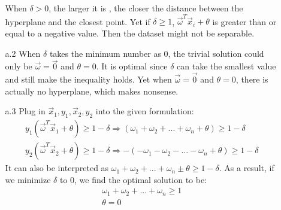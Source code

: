\begin{enumerate}
\begin{enumerate}
	\medskip
	When $\delta > 0 $, the larger it is , the closer the distance between the hyperplane and the closest point. Yet if $\delta \geq 1$, $\vec{\omega}^T\vec{x}_i + \theta$ is greater than or equal to a negative value. Then the dataset might not be separable. 
	
	\item[a.2]
	When $\delta$ takes the minimum number as 0, the trivial solution could only be $\vec{\omega} = \vec{0}$ and $\theta = 0$. It is optimal since $\delta$ can take the smallest value and still make the inequality holds. Yet when $\vec{\omega} = \vec{0}$ and $\theta = 0$, there is actually no hyperplane, which makes nonsense. 
	
	\item[a.3]
	Plug in $\vec{x}_1, y_1 ,\vec{x}_2, y_2$ into the given formulation:
	\begin{equation*}
	\begin{split}
	y_1(\vec{\omega}^T\vec{x}_1+\theta)\geq 1-\delta \Rightarrow (\omega_1 + \omega_2 + ... + \omega_n + \theta) \geq 1-\delta \\ 
	y_2(\vec{\omega}^T\vec{x}_2+\theta)\geq 1-\delta \Rightarrow -(-\omega_1 - \omega_2 - ... - \omega_n + \theta) \geq 1-\delta
	\end{split}
	\end{equation*}
	It can also be interpreted as $\omega_1 + \omega_2 + ... + \omega_n \pm \theta \geq 1-\delta$. As a result, if we minimize $\delta$ to 0, we find the optimal solution to be:
	\begin{equation*}
	\begin{split}
	\omega_1 + \omega_2 + ... + \omega_n \geq 1\\
	\theta = 0
	\end{split}
	\end{equation*}
	

\end{enumerate}
\end{enumerate}
